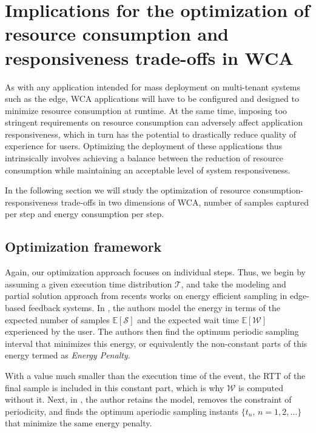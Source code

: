 \section{Implications for the optimization of resource consumption and responsiveness trade-offs in \ac{WCA}}\label{sec:implications:optimization}

As with any application intended for mass deployment on multi-tenant systems such as the edge, \ac{WCA} applications will have to be configured and designed to minimize resource consumption at runtime.
At the same time, imposing too stringent requirements on resource consumption can adversely affect application responsiveness, which in turn has the potential to drastically reduce quality of experience for users.
Optimizing the deployment of these applications thus intrinsically involves achieving a balance between the reduction of resource consumption while maintaining an acceptable level of system responsiveness.

In the following section we will study the optimization of resource consumption-responsiveness trade-offs in two dimensions of \ac{WCA}, number of samples captured per step and energy consumption per step.


\subsection{Optimization framework}\label{ssec:optframework}

Again, our optimization approach focuses on individual steps.
Thus, we begin by assuming a given execution time distribution \( \mathcal{T} \), and take the modeling and partial solution approach from recents works on energy efficient sampling in edge-based feedback systems.
In \textcite{ICCperiodic1,TMCperiodic}, the authors model the energy in terms of the expected number of samples $\mathbb{E}[\mathcal{S}]$ and the expected wait time $\mathbb{E}[\mathcal{W}]$ experienced by the user.
The authors then find the optimum periodic sampling interval that minimizes this energy, or equivalently the non-constant parts of this energy termed as \textit{Energy Penalty}.

With a value much smaller than the execution time of the event, the \ac{RTT} of the final sample is included in this constant part, which is why $\mathcal{W}$ is computed without it.
Next, in \textcite{secAperiodic}, the author retains the model, removes the constraint of periodicity, and finds the optimum aperiodic sampling instants $\{t_n,\,n=1,2,\dots\}$ that minimize the same energy penalty.

